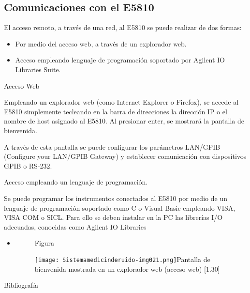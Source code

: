 \documentclass[paper=letter,oneside,fontsize=10pt,parskip=full]{article}
\begin{document}
\bigskip


\bigskip


\bigskip


\bigskip


\bigskip


\bigskip


\bigskip


\bigskip


\bigskip

\subsection{Comunicaciones con el E5810}
El acceso remoto, a través de una red, al E5810 se puede realizar de dos formas:

\begin{itemize}
\item Por medio del acceso web, a través de un explorador web.
\item Acceso empleando lenguaje de programación soportado por Agilent IO Libraries Suite.
\end{itemize}
Acceso Web

Empleando un explorador web (como Internet Explorer o Firefox), se accede al E5810 simplemente tecleando en la barra de
direcciones la dirección IP o el nombre de host asignado al E5810. Al presionar enter, se mostrará la pantalla de
bienvenida.

A través de esta pantalla se puede configurar los parámetros LAN/GPIB (Configure your LAN/GPIB Gateway) y establecer
comunicación con dispositivos GPIB o RS-232.

Acceso empleando un lenguaje de programación.

Se puede programar los instrumentos conectados al E5810 por medio de un lenguaje de programación soportado como C o
Visual Basic empleando VISA, VISA COM o SICL. Para ello se deben instalar en la PC las librerías I/O adecuadas,
conocidas como Agilent IO Libraries

\begin{itemize}
\item[] 
\begin{figure}
\centering
\begin{minipage}{11.03cm}
Figura

\texttt{[image: Sistemamedicinderuido-img021.png]}Pantalla de bienvenida mostrada en un explorador web (acceso web)
[1.30]
\end{minipage}
\end{figure}
\end{itemize}
Bibliografía
\end{document}
